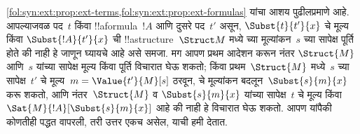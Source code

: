 \documentclass[../../../include/open-logic-section]{subfiles}
\begin{document}
\begin{explain}
  \cref{fol:syn:ext:prop:ext-terms,fol:syn:ext:prop:ext-formulas} यांचा
  आशय पुढीलप्रमाणे आहे. आपल्याजवळ पद~$t$ किंवा !!a{formula}~$!A$ आणि
  दुसरे पद~$t'$ असून, $\Subst{t}{t'}{x}$ चे मूल्य किंवा
  $\Subst{!A}{t'}{x}$ ची !!a{structure}~$\Struct M$ मध्ये
  च्या मूल्यांकन~$s$ च्या सापेक्ष पूर्ति होते की नाही हे
  जाणून घ्यायचे आहे असे समजा. मग आपण प्रथम आदेशन करून नंतर
  $\Struct{M}$ आणि~$s$ यांच्या सापेक्ष मूल्य किंवा पूर्ति विचारात घेऊ
  शकतो; किंवा प्रथम~$\Struct{M}$ मध्ये~$s$ च्या सापेक्ष~$t'$ चे
  मूल्य~$m = \Value{t'}{M}[s]$ ठरवून, चे मूल्यांकन
  बदलून~$\Subst{s}{m}{x}$ करू शकतो, आणि नंतर~$\Struct{M}$ व
  $\Subst{s}{m}{x}$ यांच्या सापेक्ष~$t$ चे मूल्य किंवा
  $\Sat{M}{!A}[\Subst{s}{m}{x}]$ आहे की नाही हे विचारात घेऊ शकतो.
  आपण यांपैकी कोणतीही पद्धत वापरली, तरी उत्तर एकच असेल, याची हमी
  देतात.
\end{explain}
\end{document}
